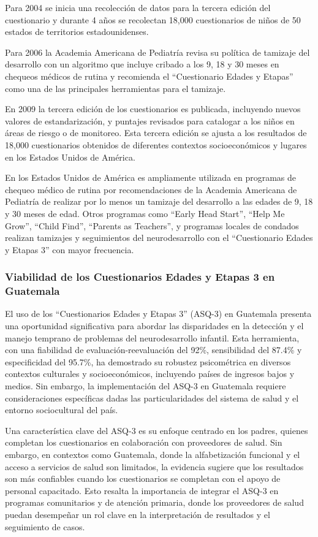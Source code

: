\documentclass[11pt,letterpaper]{report}
\begin{document}
Para 2004 se inicia una recolección de datos para la tercera edición del
cuestionario y durante 4 años se recolectan 18,000 cuestionarios de niños de 50
estados de territorios estadounidenses. \cite{ASQ4decades}

Para 2006 la Academia Americana de Pediatría revisa su política de tamizaje del
desarrollo con un algoritmo que incluye cribado a los 9, 18 y 30 meses en
chequeos médicos de rutina y recomienda el ``Cuestionario Edades y Etapas''
como una de las principales herramientas para el tamizaje.
\cite{Pediatrics2006}
 
En 2009 la tercera edición de los cuestionarios es publicada, incluyendo nuevos
valores de estandarización, y puntajes revisados para catalogar a los niños en
áreas de riesgo o de monitoreo. Esta tercera edición se ajusta a los resultados
de 18,000 cuestionarios obtenidos de diferentes contextos socioeconómicos y
lugares en los Estados Unidos de América. \cite{ASQ4decades}

En los Estados Unidos de América es ampliamente utilizada en programas de
chequeo médico de rutina por recomendaciones de la Academia Americana de
Pediatría de realizar por lo menos un tamizaje del desarrollo a las edades de
9, 18 y 30 meses de edad. Otros programas como ``Early Head Start'', ``Help Me
Grow'', ``Child Find'', ``Parents as Teachers'', y programas locales de
condados realizan tamizajes y seguimientos del neurodesarrollo con el
``Cuestionario Edades y Etapas 3'' con mayor frecuencia. \cite{ASQWorld}

\subsubsection{Viabilidad de los Cuestionarios Edades y Etapas 3 en Guatemala}
El uso de los ``Cuestionarios Edades y Etapas 3'' (ASQ-3) en Guatemala presenta
una oportunidad significativa para abordar las disparidades en la detección y
el manejo temprano de problemas del neurodesarrollo infantil. Esta herramienta,
con una fiabilidad de evaluación-reevaluación del 92\%, sensibilidad del 87.4\%
y especificidad del 95.7\%, ha demostrado su robustez psicométrica en diversos
contextos culturales y socioeconómicos, incluyendo países de ingresos bajos y
medios. Sin embargo, la implementación del ASQ-3 en Guatemala requiere
consideraciones específicas dadas las particularidades del sistema de salud y
el entorno sociocultural del país. \cite{Vameghi2013-uo, Manasyan2023}

Una característica clave del ASQ-3 es su enfoque centrado en los padres,
quienes completan los cuestionarios en colaboración con proveedores de salud.
Sin embargo, en contextos como Guatemala, donde la alfabetización funcional y
el acceso a servicios de salud son limitados, la evidencia sugiere que los
resultados son más confiables cuando los cuestionarios se completan con el
apoyo de personal capacitado. Esto resalta la importancia de integrar el ASQ-3
en programas comunitarios y de atención primaria, donde los proveedores de
salud puedan desempeñar un rol clave en la interpretación de resultados y el
seguimiento de casos. \cite{Manasyan2023, Colbert2021}
\end{document}
